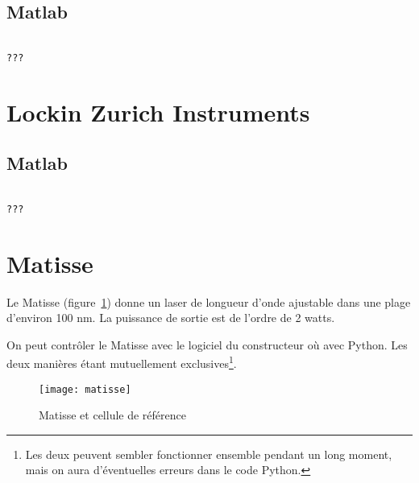 \documentclass[11pt,francais]{book} %
\begin{document}
\subsection{Matlab}

\begin{lstlisting}[frame=single,caption={Exemple d'utilisation de HydraHarp avec Matlab},label={lst:exhydraharp},breaklines=true,]  % Start your code-block

???
\end{lstlisting}


\section{Lockin Zurich Instruments}

\subsection{Matlab}

\begin{lstlisting}[frame=single,caption={Exemple d'utilisation du lockin Surich Instruments avec Matlab},label={lst:exlockinzi},breaklines=true,]  % Start your code-block
  
???
\end{lstlisting}


\section{Matisse}

Le Matisse (figure~\ref{fig:matisse}) donne un laser de longueur d'onde ajustable dans une plage d'environ 100 nm.
La puissance de sortie est de l'ordre de 2 watts.

On peut contrôler le Matisse avec le logiciel du constructeur où avec Python.
Les deux manières étant mutuellement exclusives\footnote{Les deux peuvent sembler fonctionner ensemble pendant un long moment, mais on aura d'éventuelles erreurs dans le code Python.}.

\begin{figure}[h]
  \centering\texttt{[image: matisse]}
  \caption{Matisse et cellule de référence}
  \label{fig:matisse}
\end{figure}
\end{document}
